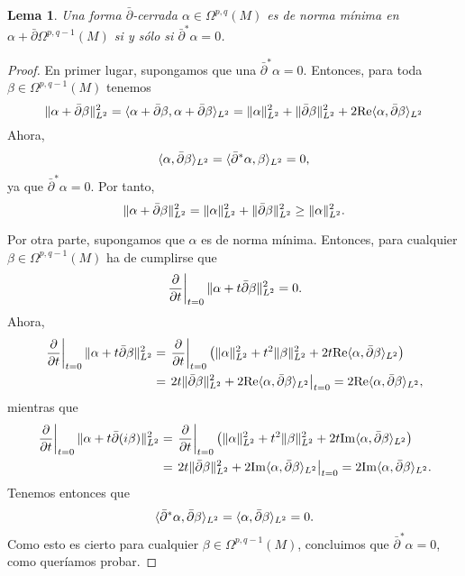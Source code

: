 \documentclass[12pt,a4paper]{article}
\newtheorem{lema}{Lema}
\theoremstyle{definition} \newtheorem{defn}[thm]{Definición}
\theoremstyle{definition} \newtheorem{ejemplo}[thm]{Ejemplo}
\theoremstyle{definition} \newtheorem{ejercicio}[thm]{Ejercicio}
\theoremstyle{remark} \newtheorem*{obs}{Observación}
\DeclarePairedDelimiter\norm{\lVert}{\rVert}
\DeclarePairedDelimiter\esc{\langle}{\rangle}
\newcommand{\dol}{\bar{\partial}}
\begin{document}
  \begin{lema}
    Una forma $\dol$-cerrada $\alpha \in \Omega^{p,q}(M)$ es de norma mínima en $\alpha + \dol \Omega^{p,q-1}(M)$ si y sólo si $\dol^*\alpha = 0$.
  \end{lema}
  \begin{proof}
    En primer lugar, supongamos que una $\dol^*\alpha = 0$. Entonces, para toda $\beta \in \Omega^{p,q-1}(M)$ tenemos
    \begin{equation*}
      \norm{\alpha+\dol \beta}_{L^2}^2=\esc{\alpha+\dol\beta,\alpha+\dol\beta}_{L^2}=\norm{\alpha}_{L^2}^2 + \norm{\dol \beta}_{L^2}^2 + 2 \mathrm{Re} \esc{\alpha, \dol\beta}_{L^2}
    \end{equation*}
    Ahora, 
    \begin{equation*}
      \esc{\alpha,\dol \beta}_{L^2}=\esc{\dol^* \alpha, \beta}_{L^2}=0,
    \end{equation*}
    ya que $\dol^*\alpha = 0$.
    Por tanto, 
    \begin{equation*}
      \norm{\alpha+\dol \beta}_{L^2}^2=\norm{\alpha}_{L^2}^2 + \norm{\dol \beta}_{L^2}^2 \geq \norm{\alpha}_{L^2}^2.
    \end{equation*}

    Por otra parte, supongamos que $\alpha$ es de norma mínima. Entonces, para cualquier $\beta \in \Omega^{p,q-1}(M)$ ha de cumplirse que
    \begin{equation*}
      \left. \frac{\partial}{\partial t}\right|_{t=0} \norm{\alpha + t \dol \beta}^2_{L^2}=0.
    \end{equation*}
  Ahora,
  \begin{align*}
    \left. \frac{\partial}{\partial t}\right|_{t=0} \norm{\alpha + t \dol \beta}^2_{L^2}&=\left. \frac{\partial}{\partial t}\right|_{t=0} \left( \norm{\alpha}_{L^2}^2 + t^2 \norm{\beta}_{L^2}^2 + 2t \mathrm{Re}\esc{\alpha,\dol \beta}_{L^2} \right)\\ &= \left. 2t \norm{\dol \beta}^2_{L^2} + 2 \mathrm{Re}\esc{\alpha,\dol \beta}_{L^2} \right|_{t=0} = 2 \mathrm{Re}\esc{\alpha,\dol \beta}_{L^2},
  \end{align*}
  mientras que
  \begin{align*}
    \left. \frac{\partial}{\partial t}\right|_{t=0} \norm{\alpha + t \dol (i\beta)}^2_{L^2}&=\left. \frac{\partial}{\partial t}\right|_{t=0} \left( \norm{\alpha}_{L^2}^2 + t^2 \norm{\beta}_{L^2}^2 + 2t \mathrm{Im}\esc{\alpha,\dol \beta}_{L^2} \right)\\ &= \left. 2t \norm{\dol \beta}^2_{L^2} + 2 \mathrm{Im}\esc{\alpha,\dol \beta}_{L^2} \right|_{t=0} = 2 \mathrm{Im}\esc{\alpha,\dol \beta}_{L^2}.
  \end{align*}
  Tenemos entonces que $$\esc{\dol^*\alpha, \dol \beta}_{L^2}=\esc{\alpha, \dol \beta}_{L^2}=0.$$
  Como esto es cierto para cualquier $\beta \in \Omega^{p,q-1}(M)$, concluimos que $\dol^*\alpha=0$, como queríamos probar.
  \end{proof}
\end{document}
